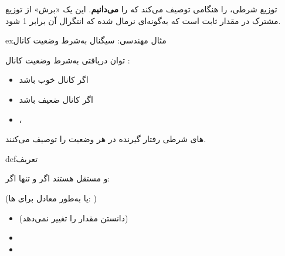 





توزیع شرطی،  را هنگامی توصیف می‌کند که  را \textbf{می‌دانیم}. این یک «برش» از توزیع مشترک در مقدار ثابت  است که به‌گونه‌ای نرمال شده که انتگرال آن برابر 1 شود.

\begin{PSbox}[unbreakable]{ex}{مثال مهندسی: سیگنال به‌شرط وضعیت کانال}

توان دریافتی  به‌شرط وضعیت کانال :

\begin{itemize}
\tightlist
\item
  اگر کانال خوب باشد 
\item
  اگر کانال ضعیف باشد 
\item
  ، 
\end{itemize}

‌های شرطی رفتار گیرنده در هر وضعیت را توصیف می‌کنند.

\end{PSbox}


\begin{PSbox}[unbreakable]{def}{تعریف}

 و  مستقل هستند اگر و تنها اگر:


(یا به‌طور معادل برای ‌ها: )

\end{PSbox}


\begin{itemize}
\tightlist
\item
   (دانستن  مقدار  را تغییر نمی‌دهد)
\item
\item
\end{itemize}

